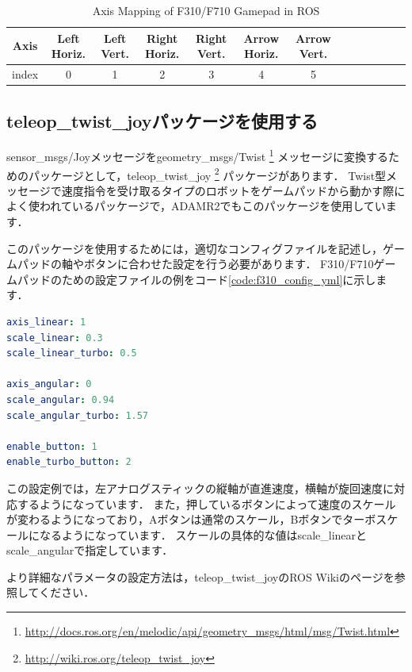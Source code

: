 \documentclass[{../../master}]{subfiles}
\begin{document}
\begin{table}[h]
  \begin{center}
    \caption{Axis Mapping of F310/F710 Gamepad in ROS}
    \begin{tabular}{|c|c|c|c|c|c|c|c|c|c|c|c|c|} \hline
      Axis  & Left Horiz. & Left Vert. & Right Horiz. & Right Vert. & Arrow Horiz. & Arrow Vert. \\ \hline
      index & 0 & 1 & 2 & 3 & 4  & 5 \\ \hline
    \end{tabular}
    \label{tab:axis_mapping}
  \end{center}
\end{table}

\subsection{\textsf{teleop\_twist\_joy}パッケージを使用する}

\textsf{sensor\_msgs/Joy}メッセージを\textsf{geometry\_msgs/Twist}
\footnote{\url{http://docs.ros.org/en/melodic/api/geometry_msgs/html/msg/Twist.html}}
メッセージに変換するためのパッケージとして，\textsf{teleop\_twist\_joy}
\footnote{\url{http://wiki.ros.org/teleop_twist_joy}}
パッケージがあります．
\textsf{Twist}型メッセージで速度指令を受け取るタイプのロボットをゲームパッドから動かす際によく使われているパッケージで，ADAMR2でもこのパッケージを使用しています．

このパッケージを使用するためには，適切なコンフィグファイルを記述し，ゲームパッドの軸やボタンに合わせた設定を行う必要があります．
F310/F710ゲームパッドのための設定ファイルの例をコード\ref{code:f310_config_yml}に示します．

\begin{lstlisting}[language=yaml, label=code:f310_config_yml, caption=Example of Configuration for F310]
axis_linear: 1
scale_linear: 0.3
scale_linear_turbo: 0.5

axis_angular: 0
scale_angular: 0.94
scale_angular_turbo: 1.57

enable_button: 1
enable_turbo_button: 2
\end{lstlisting}

この設定例では，左アナログスティックの縦軸が直進速度，横軸が旋回速度に対応するようになっています．
また，押しているボタンによって速度のスケールが変わるようになっており，Aボタンは通常のスケール，Bボタンでターボスケールになるようになっています．
スケールの具体的な値は\textsf{scale\_linear}と\textsf{scale\_angular}で指定しています．

より詳細なパラメータの設定方法は，\textsf{teleop\_twist\_joy}のROS Wikiのページを参照してください．
\end{document}
